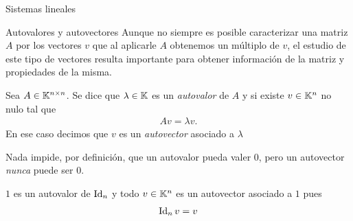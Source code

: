 \begin{chapter}{Sistemas lineales}
\begin{section}{Autovalores y autovectores}
    Aunque no siempre es posible caracterizar una matriz $A$  por los vectores $v$ que  al aplicarle $A$  obtenemos un múltiplo de $v$,  el estudio de este tipo de vectores  resulta importante para obtener información de la matriz y propiedades de la misma.  
    
    


    \begin{definicion}
        Sea $A\in\mathbb K^{n\times n}$. Se dice que {$\lambda\in\mathbb K$} es un \textit{autovalor} de $A$ y si existe \textit{$v\in\mathbb K^{n}$} no nulo tal que 
        \begin{align*}
        Av=\lambda v .
        \end{align*}
        En ese caso decimos que $v$  es un \textit{autovector} asociado a $\lambda$
        \end{definicion}

        \begin{observacion*} Nada impide, por definición, que un autovalor pueda valer $0$, pero un autovector \textit{nunca} puede ser $0$. 
        \end{observacion*}

        \begin{ejemplo*}
        $1$ es un autovalor de $\operatorname{Id}_n$ y todo $v\in\mathbb K^n$ es un autovector asociado a $1$ pues
        \begin{align*}
        \operatorname{Id}_n v= v 
        \end{align*}
        \end{ejemplo*}
        

\end{section}
\end{chapter}
